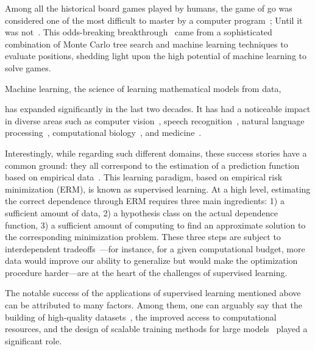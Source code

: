 Among all the historical board games played by humans, the game of go was considered one of the most difficult to master by a computer program~\citep{van2002games}; Until it was not~\citep{silver2016mastering}. This odds-breaking breakthrough~\citep{muller2002computer,van2002games} came from a sophisticated combination of Monte Carlo tree search and machine learning techniques to evaluate positions, shedding light upon the high potential of machine learning to solve games. 






Machine learning, the science of learning mathematical models from data,

has expanded significantly in the last two decades. It has had a noticeable impact in diverse areas such as computer vision~\citep{krizhevsky2012imagenet}, speech recognition~\citep{hinton2012deep}, natural language processing~\citep{sutskever2014sequence}, computational biology~\citep{libbrecht2015machine}, and medicine~\citep{esteva2017dermatologist}. 




Interestingly, while regarding such different domains, these success stories have a common ground: they all correspond to the estimation of a prediction function based on empirical data~\citep{vapnik2006estimation}. This learning paradigm, based on empirical risk minimization (ERM), is known as supervised learning. At a high level, estimating the correct dependence through ERM requires three main ingredients: 1) a sufficient amount of data, 2) a hypothesis class on the actual dependence function, 3) a sufficient amount of computing to find an approximate solution to the corresponding minimization problem. These three steps are subject to interdependent tradeoffs~\citep{bottou2008tradeoffs}---for instance, for a given computational budget, more data would improve our ability to generalize but would make the optimization procedure harder---are at the heart of the challenges of supervised learning. 




The notable success of the applications of supervised learning mentioned above can be attributed to many factors. Among them, one can arguably say that the building of high-quality datasets~\citep{russakovsky2015imagenet}, the improved access to computational resources, and the design of scalable training methods for large models~\citep{lecun1998gradient} played a significant role.


